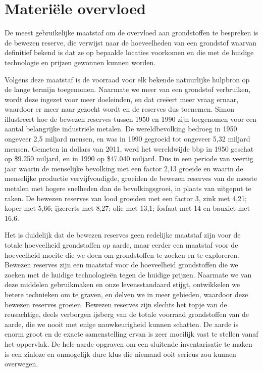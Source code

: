 \section{Materiële overvloed}

De meest gebruikelijke maatstaf om de overvloed aan grondstoffen te
bespreken is de bewezen reserve, die verwijst naar de hoeveelheden van
een grondstof waarvan definitief bekend is dat ze op bepaalde locaties
voorkomen en die met de huidige technologie en prijzen gewonnen kunnen
worden.\autocite{27}

Volgens deze maatstaf is de voorraad voor elk bekende natuurlijke
hulpbron op de lange termijn toegenomen. Naarmate we meer van een
grondstof verbruiken, wordt deze ingezet voor meer doeleinden, en dat
creëert meer vraag ernaar, waardoor er meer naar gezocht wordt en de
reserves dus toenemen. Simon illustreert hoe de bewezen reserves tussen
1950 en 1990 zijn toegenomen voor een aantal belangrijke industriële
metalen. De wereldbevolking bedroeg in 1950 ongeveer 2,5 miljard mensen,
en was in 1990 gegroeid tot ongeveer 5,32 miljard
mensen.\autocite{28} Gemeten in dollars van 2011, werd het wereldwijde bbp in 1950
geschat op \$9.250 miljard, en in 1990 op \$47.040
miljard.\autocite{29} Dus in een periode van veertig jaar waarin de
menselijke bevolking met een factor 2,13 groeide en waarin de menselijke
productie vervijfvoudigde, groeiden de bewezen reserves van de meeste
metalen met hogere snelheden dan de bevolkingsgroei, in plaats van
uitgeput te raken. De bewezen reserves van lood groeiden met een factor
3, zink met 4,21; koper met 5,66; ijzererts met 8,27; olie met 13,1;
fosfaat met 14 en bauxiet met 16,6.\autocite{30}

Het is duidelijk dat de bewezen reserves geen redelijke maatstaf zijn
voor de totale hoeveelheid grondstoffen op aarde, maar eerder een
maatstaf voor de hoeveelheid moeite die we doen om grondstoffen te
zoeken en te exploreren. Bewezen reserves zijn een maatstaf voor de
hoeveelheid grondstoffen die we zoeken met de huidige technologieën
tegen de huidige prijzen. Naarmate we van deze middelen gebruikmaken en
onze levensstandaard stijgt, ontwikkelen we betere technieken om te
graven, en delven we in meer gebieden, waardoor deze bewezen reserves
groeien. Bewezen reserves zijn slechts het topje van de reusachtige,
deels verborgen ijsberg van de totale voorraad grondstoffen van de
aarde, die we nooit met enige nauwkeurigheid kunnen schatten. De aarde
is enorm groot en de exacte samenstelling ervan is zeer moeilijk vast te
stellen vanaf het oppervlak. De hele aarde opgraven om een sluitende
inventarisatie te maken is een zinloze en onmogelijk dure klus die
niemand ooit serieus zou kunnen overwegen.

